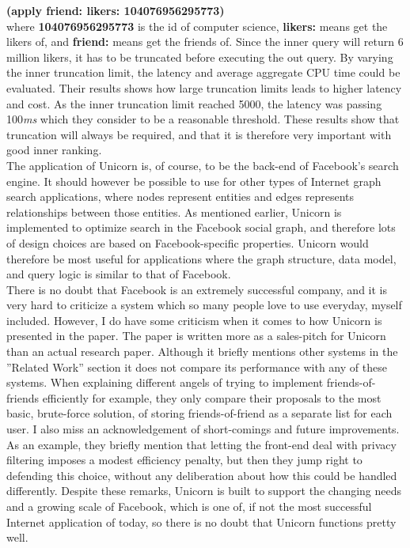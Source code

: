 \documentclass{article}
\begin{document}
\noindent \textbf{(apply friend: likers: 104076956295773)}\\

where \textbf{104076956295773} is the id of computer science, \textbf{likers:} means get the likers of, and \textbf{friend:} means get the friends of. Since the inner query will return 6 million likers, it has to be truncated before executing the out query. By varying the inner truncation limit, the latency and average aggregate CPU time could be evaluated. Their results shows how large truncation limits leads to higher latency and cost. As the inner truncation limit reached 5000, the latency was passing 100\textit{ms} which they consider to be a reasonable threshold. These results show that truncation will always be required, and that it is therefore very important with good inner ranking.\\


\noindent The application of Unicorn is, of course, to be the back-end of Facebook's search engine. It should however be possible to use for other types of Internet graph search applications, where nodes represent entities and edges represents relationships between those entities. As mentioned earlier, Unicorn is implemented to optimize search in the Facebook social graph, and therefore lots of design choices are based on Facebook-specific properties. Unicorn would therefore be most useful for applications where the graph structure, data model, and query logic is similar to that of Facebook. \\


\noindent There is no doubt that Facebook is an extremely successful company, and it is very hard to criticize a system which so many people love to use everyday, myself included. However, I do have some criticism when it comes to how Unicorn is presented in the paper. The paper is written more as a sales-pitch for Unicorn than an actual research paper. Although it briefly mentions other systems in the ''Related Work'' section it does not compare its performance with any of these systems. When explaining different angels of trying to implement friends-of-friends efficiently for example, they only compare their proposals to the most basic, brute-force solution, of storing friends-of-friend as a separate list for each user. I also miss an acknowledgement of short-comings and future improvements. As an example, they briefly mention that letting the front-end deal with privacy filtering imposes a modest efficiency penalty, but then they jump right to defending this choice, without any deliberation about how this could be handled differently. Despite these remarks, Unicorn is built to support the changing needs and a growing scale of Facebook, which is one of, if not the most successful Internet application of today, so there is no doubt that Unicorn functions pretty well.
\end{document}
